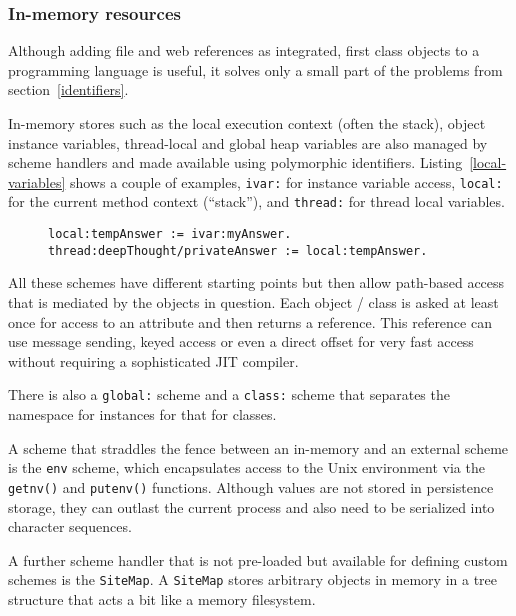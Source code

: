 \documentclass[preprint,authoryear]{acm_proc_article-sp}
\begin{document}
\subsubsection{In-memory resources}
\label{inmemory}

Although adding file and web references as integrated, first class objects to a programming
language is useful, it solves only a small part of the problems from section~\ref{identifiers}.

In-memory stores such as the local execution context (often the stack), object instance
variables, thread-local and global heap variables are also managed by scheme handlers
and made available using polymorphic identifiers.  Listing~\ref{local-variables} shows
a couple of examples, {\tt ivar:} for instance variable access, {\tt local:} for the current
method context (``stack''), and {\tt thread:} for thread local variables.

\begin{figure}[htbp]
\begin{lstlisting}[style=numbers,label=local-variables,caption=Different memory variables.]
local:tempAnswer := ivar:myAnswer.
thread:deepThought/privateAnswer := local:tempAnswer.
\end{lstlisting}
\end{figure}

All these schemes have different starting points but then allow path-based access
that is mediated by the objects in question.   Each object / class is asked at least
once for access to an attribute and then returns a reference.   This reference can
use message sending, keyed access or even a direct offset for very fast
access without requiring a sophisticated JIT compiler.

There is also a {\tt global:} scheme and a {\tt class:} scheme that separates
the namespace for instances for that for classes. 



A scheme that straddles the fence between an in-memory and an external 
scheme is the {\tt env} scheme, which encapsulates access to the Unix
environment via the {\tt getnv()} and {\tt putenv()} functions.  Although 
values are not stored in persistence storage, they can outlast the
current process and also need to be serialized into character sequences.

A further scheme handler that is not pre-loaded but available for defining
custom schemes is the {\tt SiteMap}.  A {\tt SiteMap} stores arbitrary objects
in memory in a tree structure that acts a bit like a memory filesystem.
\end{document}
